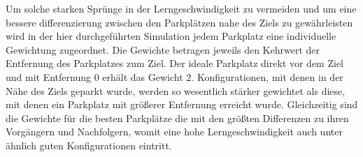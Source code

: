 Um solche starken Sprünge in der Lerngeschwindigkeit zu vermeiden und um eine bessere differenzierung zwischen den Parkplätzen nahe des Ziels zu gewährleisten wird in der hier durchgeführten Simulation jedem Parkplatz eine individuelle Gewichtung zugeordnet. Die Gewichte betragen jeweils den Kehrwert der Entfernung des Parkplatzes zum Ziel. Der ideale Parkplatz direkt vor dem Ziel und mit Entfernung $0$ erhält das Gewicht $2$. Konfigurationen, mit denen in der Nähe des Ziels geparkt wurde, werden so wesentlich stärker gewichtet als diese, mit denen ein Parkplatz mit größerer Entfernung erreicht wurde. Gleichzeitig sind die Gewichte für die besten Parkplätze die mit den größten Differenzen zu ihren Vorgängern und Nachfolgern, womit eine hohe Lerngeschwindigkeit auch unter ähnlich guten Konfigurationen eintritt. 
